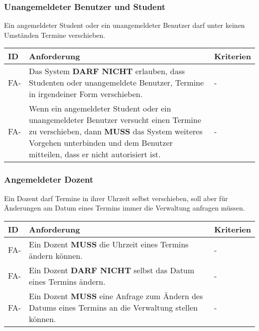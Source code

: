 \subsubsection{Unangemeldeter Benutzer und Student}
Ein angemeldeter Student oder ein unangemeldeter Benutzer darf unter keinen Umständen Termine verschieben.

\vspace{12pt}

\begin{tabular} {|p{}|p{11cm}|p{}|}
	\hline
	ID & Anforderung & Kriterien \\
	\hline
	FA-
	& Das System \textbf{DARF NICHT} erlauben, dass Studenten oder unangemeldete Benutzer, Termine in irgendeiner Form verschieben. 
	& - \\
	\hline
	FA-
	& Wenn ein angemeldeter Student oder ein unangemeldeter Benutzer versucht einen Termine zu verschieben, dann \textbf{MUSS} das System weiteres Vorgehen unterbinden und dem Benutzer mitteilen, dass er nicht autorisiert ist.
	& - \\ 
	\hline
\end{tabular}

\vspace{12pt}

\subsubsection{Angemeldeter Dozent}

Ein Dozent darf Termine in ihrer Uhrzeit selbst verschieben, soll aber für Änderungen am Datum eines Termins immer die Verwaltung anfragen müssen.

\vspace{12pt}

\begin{tabular} {|p{}|p{11cm}|p{}|}
	\hline
	ID & Anforderung & Kriterien \\
	\hline
	FA-
	& Ein Dozent \textbf{MUSS} die Uhrzeit eines Termins ändern können.
	& - \\
	\hline
	FA-
	& Ein Dozent \textbf{DARF NICHT} selbst das Datum eines Termins ändern.
	& - \\
	\hline
	FA-
	& Ein Dozent \textbf{MUSS} eine Anfrage zum Ändern des Datums eines Termins an die Verwaltung stellen können.
	& - \\
	\hline
\end{tabular}

\vspace{12pt}


